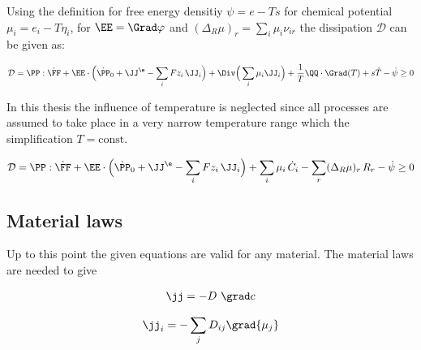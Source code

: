 Using the definition for free energy densitiy $\psi=e-Ts$ for chemical potential $\mu_i=e_i-T\eta_i$, for  $\EE=\Grad\varphi$ and $(\Delta_R\mu)_r=\sum_i \mu_i\nu_{ir}$
the dissipation $\mathcal{D}$ can be given as:

\begin{align}
  \mathcal{D} = \PP:\dot\FF + \EE\cdot\Big(\dot\PP_0+\JJ^\e-\sum_i Fz_i\,\JJ_i\Big) + \Div\Big(\sum_i\mu_i\JJ_i\Big)+ \frac{1}{T} \QQ\cdot\Grad(T) + s\dot T -\dot \psi\geq 0
\end{align}

In this thesis the influence of temperature is neglected since all processes are assumed to take place in a very narrow temperature range which the simplification
$T=\text{const}$.  

\begin{align}
  \mathcal{D} = \PP:\dot\FF + \EE\cdot\Big(\dot\PP_0+\JJ^\e-\sum_i Fz_i\,\JJ_i\Big) + \sum_i \mu_i\,\dot C_i - \sum_r (\Delta_R\mu)_r \,R_r - \dot\psi\geq 0
\end{align}

\subsection{Material laws}
Up to this point the given equations are valid for any material. The material laws are needed to give 

\begin{align}
  \jj = -D \ \grad c 
\end{align}

\begin{align}
  \jj_i = -\sum_j D_{ij} \grad{\mu_j}
\end{align}